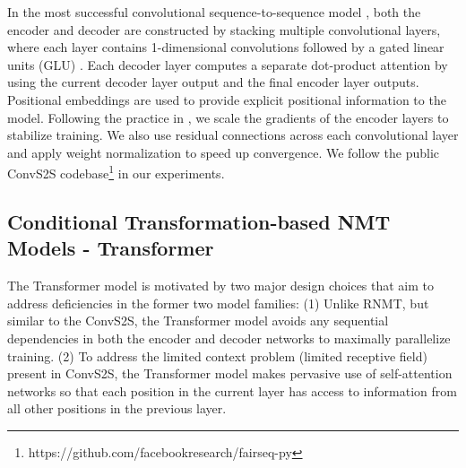 \documentclass[11pt,a4paper]{article}
\begin{document}
In the most successful convolutional sequence-to-sequence model
\cite{DBLP:journals/corr/GehringAGYD17}, both the encoder and decoder
are constructed by stacking multiple convolutional layers, where each
layer contains 1-dimensional convolutions followed by a gated linear units
(GLU) \cite{DBLP:journals/corr/DauphinFAG16}.
Each decoder layer computes a separate dot-product
attention by using the current decoder layer output and the final encoder layer
outputs. Positional embeddings are used to provide explicit positional information to the model.
Following the practice in \cite{DBLP:journals/corr/GehringAGYD17}, we scale the
gradients of the encoder layers to stabilize training. We also use residual
connections across each convolutional layer and apply weight normalization
\cite{DBLP:journals/corr/SalimansK16} to speed up convergence. We follow
the public ConvS2S codebase\footnote{https://github.com/facebookresearch/fairseq-py} in our experiments.




\subsection{Conditional Transformation-based NMT Models - Transformer}
\label{subsec:transf}

The Transformer model \cite{DBLP:journals/corr/VaswaniSPUJGKP17} is motivated
by two major design choices that aim to address deficiencies in the former two
model families: (1) Unlike RNMT, but similar to the ConvS2S, the
Transformer model avoids any sequential dependencies in both the encoder and
decoder networks to maximally parallelize training. (2) To address the limited
context problem (limited receptive field) present in ConvS2S,
the Transformer model makes pervasive use of self-attention networks
\cite{Parikh2016ADA} so that
each position in the current layer has access to information from all other
positions in the previous layer.
\end{document}
